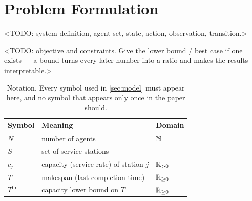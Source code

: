 \documentclass[10pt]{article}
\begin{document}
\section{Problem Formulation}
\label{sec:problem}

<TODO: system definition, agent set, state, action, observation, transition.>

<TODO: objective and constraints. Give the lower bound / best case if one exists —
a bound turns every later number into a ratio and makes the results interpretable.>

\begin{table}[t]
  \centering
  \caption{Notation. Every symbol used in \cref{sec:model} must appear here, and
    no symbol that appears only once in the paper should.}
  \label{tab:notation}
  \begin{tabular}{@{}lll@{}}
    \toprule
    Symbol & Meaning & Domain \\
    \midrule
    $N$ & number of agents & $\mathbb{N}$ \\
    $S$ & set of service stations & --- \\
    $c_j$ & capacity (service rate) of station $j$ & $\mathbb{R}_{>0}$ \\
    $T$ & makespan (last completion time) & $\mathbb{R}_{\ge 0}$ \\
    $T^{\mathrm{lb}}$ & capacity lower bound on $T$ & $\mathbb{R}_{\ge 0}$ \\
    \bottomrule
  \end{tabular}
\end{table}
\end{document}
